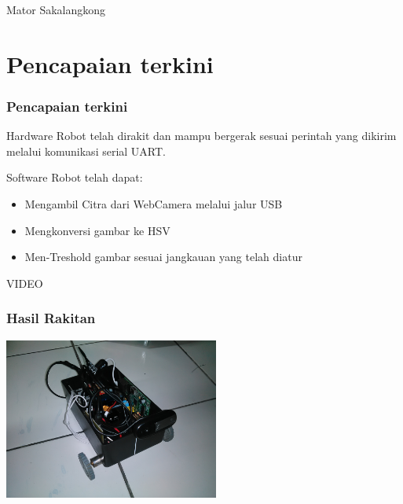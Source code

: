 \documentclass[table,dvipsnames]{beamer}
\begin{document}
\begin{frame}
\Huge{\centerline{Mator Sakalangkong}}
\end{frame}

\section{Pencapaian terkini}

\begin{frame}
\frametitle{Pencapaian terkini}
\begin{block}{Hardware}
Robot telah dirakit dan mampu bergerak sesuai perintah yang dikirim melalui komunikasi serial UART.
\end{block}
\begin{block}{Software}
Robot telah dapat:
\begin{itemize}
\item Mengambil Citra dari WebCamera melalui jalur USB
\item Mengkonversi gambar ke HSV
\item Men-Treshold gambar sesuai jangkauan yang telah diatur
\end{itemize}
\end{block}
\begin{block}{}
VIDEO
\end{block}
\end{frame}

\begin{frame}
\frametitle{Hasil Rakitan}
\begin{center}
 \includegraphics[width=200pt]{./progress/builded}
\end{center}
\end{frame}
\end{document}
